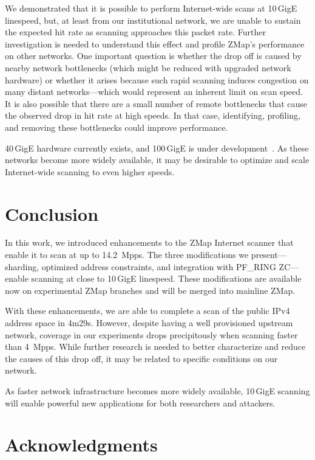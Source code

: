 We demonstrated that it is possible to perform Internet-wide scans at
10\,GigE linespeed, but, at least from our institutional network, we are
unable to sustain the expected hit rate as scanning approaches this packet
rate. Further investigation is needed to understand this effect and profile
ZMap's performance on other networks. One important question is whether the
drop off is caused by nearby network bottlenecks (which might be reduced with
upgraded network hardware) or whether it arises because such rapid scanning
induces congestion on many distant networks---which would represent an
inherent limit on scan speed. It is also possible that there are a small
number of remote bottlenecks that cause the observed drop in hit rate at high
speeds. In that case, identifying, profiling, and removing these bottlenecks
could improve performance.

40\,GigE hardware currently exists, and 100\,GigE is under
development~\cite{hundred-gig}. As these networks become more widely
available, it may be desirable to optimize and scale Internet-wide scanning
to even higher speeds.

\section{Conclusion}

In this work, we introduced enhancements to the ZMap Internet scanner that
enable it to scan at up to 14.2~Mpps. The three modifications we
present---sharding, optimized address constraints, and integration with
PF\_RING ZC---enable scanning at close to 10\,GigE linespeed. These
modifications are available now on experimental ZMap branches and will be
merged into mainline ZMap.

With these enhancements, we are able to complete a scan of the public IPv4
address space in 4m29s. However, despite having a well provisioned upstream
network, coverage in our experiments drops precipitously when scanning faster
than 4~Mpps. While further research is needed to better characterize and
reduce the causes of this drop off, it may be related to specific conditions
on our network.

As faster network infrastructure becomes more widely available, 10\,GigE
scanning will enable powerful new applications for both researchers and
attackers.

\section*{Acknowledgments}

